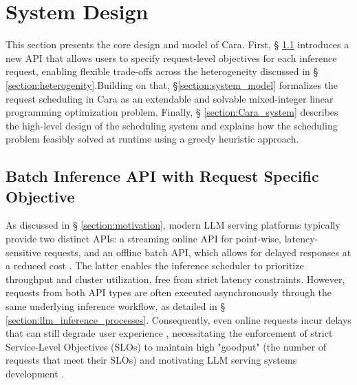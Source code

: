 \documentclass[letterpaper, anonymous, twocolumn, 10pt]{article}
\begin{document}



\section{System Design} \label{section:design}

This section presents the core design and model of Cara. First, § \ref{section:API} introduces a new API that allows users to specify request-level objectives for each inference request, enabling flexible trade-offs across the heterogeneity discussed in § \ref{section:heterogenity}.Building on that, \S \ref{section:system_model} formalizes the request scheduling in Cara as an extendable and solvable mixed-integer linear programming optimization problem. Finally, § \ref{section:Cara_system} describes the high-level design of the scheduling system and explains how the scheduling problem feasibly solved at runtime using a greedy heuristic approach.

\subsection{Batch Inference API with Request Specific Objective} \label{section:API}

As discussed in § \ref{section:motivation}, modern LLM serving platforms typically provide two distinct APIs: a streaming online API for point-wise, latency-sensitive requests, and an offline batch API, which allows for delayed responses at a reduced cost \cite{googleBatchGemini, openaiOpenAIPlatform}. The latter enables the inference scheduler to prioritize throughput and cluster utilization, free from strict latency constraints. However, requests from both API types are often executed asynchronously through the same underlying inference workflow, as detailed in § \ref{section:llm_inference_processes}. Consequently, even online requests incur delays that can still degrade user experience \cite{wang2024revisitingslogoodputmetrics}, necessitating the enforcement of strict Service-Level Objectives (SLOs) to maintain high "goodput" (the number of requests that meet their SLOs) and motivating LLM serving systems development \cite{liu2025turbospecclosedloopspeculationcontrol, zhong2024distservedisaggregatingprefilldecoding, wang2025prefilldecodeaggregationdisaggregationunifying} .
\end{document}
